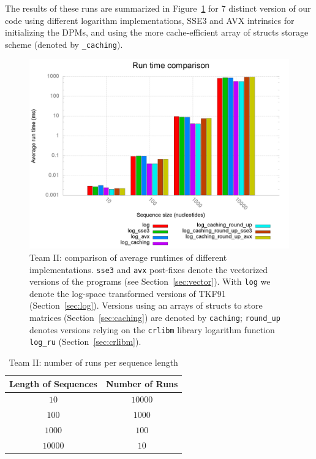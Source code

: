 \documentclass[runningheads,a4paper]{llncs}
\begin{document}
The results of these runs are summarized in Figure~\ref{fig:runtime} for 7 distinct version of our code using different logarithm implementations, SSE3 and AVX intrinsics for 
initializing the DPMs, and using the more cache-efficient array of structs storage scheme (denoted by \verb|_caching|).



\begin{figure}[h]
\includegraphics[width=\textwidth]{images/benchplot.png}
    \caption{Team II: comparison of average runtimes of different implementations. \texttt{sse3} and \texttt{avx} post-fixes denote the vectorized versions of the programs 
(see Section~\ref{sec:vector}). With \texttt{log} we denote the log-space transformed versions of TKF91 (Section~\ref{sec:log}).
Versions using an arrays of structs to store matrices (Section~\ref{sec:caching}) are denoted by \texttt{caching}; \texttt{round\_up} denotes versions relying on the \texttt{crlibm}
library logarithm function \texttt{log\_ru} (Section~\ref{sec:crlibm}).}
\label{fig:runtime}
\end{figure}

\begin{table}
\centering

\begin{tabular}{|c|c|}
\hline
Length of Sequences & Number of Runs \\
\hline
$10$ & $10000$ \\
\hline
$100$ & $1000$ \\
\hline
$1000$ & $100$ \\
\hline
$10000$ & $10$ \\
\hline
\end{tabular}
\caption{Team II: number of runs per sequence length}
\label{fig:runs}
\end{table}
\end{document}
